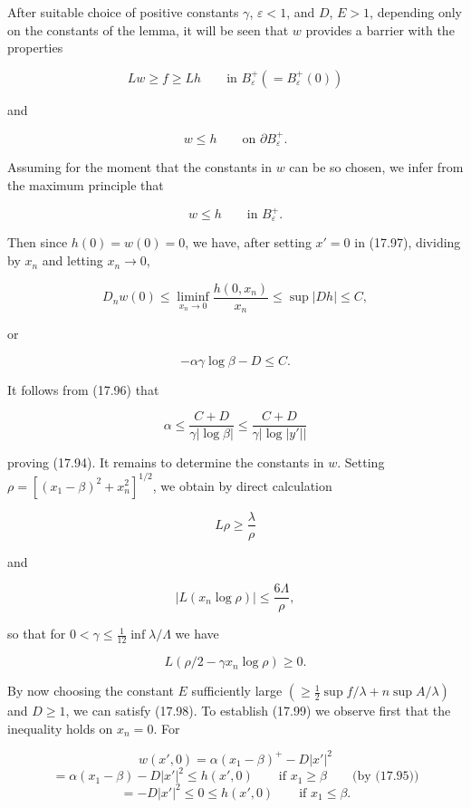After suitable choice of positive constants $\gamma$, $\varepsilon < 1$, and $D$, $E > 1$, depending only on the constants of the lemma, it will be seen that $w$ provides a barrier with the properties

\begin{equation}
\tag{17.98}
Lw \geq f \geq Lh \qquad \text{in } B_\varepsilon^+(= B_\varepsilon^+(0))
\end{equation}

and

\begin{equation}
\tag{17.99}
w \leq h \qquad \text{on } \partial B_\varepsilon^+.
\end{equation}

Assuming for the moment that the constants in $w$ can be so chosen, we infer from the maximum principle that

\[
w \leq h \qquad \text{in } B_\varepsilon^+.
\]


Then since $h(0) = w(0) = 0$, we have, after setting $x' = 0$ in (17.97), dividing by $x_n$
and letting $x_n \to 0$,

\[
D_n w(0) \leq \liminf_{x_n \to 0} \frac{h(0,x_n)}{x_n} \leq \sup |Dh| \leq C,
\]

or

\[
-\alpha \gamma \log \beta - D \leq C.
\]

It follows from (17.96) that

\[
\alpha \leq \frac{C + D}{\gamma |\log \beta|} \leq \frac{C + D}{\gamma |\log |y'||}
\]

proving (17.94).
It remains to determine the constants in $w$. Setting $\rho = \left[(x_1 - \beta)^2 + x_n^2\right]^{1/2}$, we
obtain by direct calculation

\[
L \rho \geq \frac{\lambda}{\rho}
\]

and

\[
|L(x_n \log \rho)| \leq \frac{6\Lambda}{\rho},
\]

so that for $0 < \gamma \leq \frac{1}{12} \inf \lambda/\Lambda$ we have

\[
L(\rho/2 - \gamma x_n \log \rho) \geq 0.
\]

By now choosing the constant $E$ sufficiently large $(\geq \frac{1}{2} \sup f/\lambda + n \sup A/\lambda)$ and
$D \geq 1$, we can satisfy (17.98).
To establish (17.99) we observe first that the inequality holds on $x_n = 0$. For

\[
w(x',0) = \alpha(x_1 - \beta)^+ - D|x'|^2
\]
\[
= \alpha(x_1 - \beta) - D|x'|^2 \leq h(x',0) \qquad \text{if } x_1 \geq \beta \qquad \text{(by (17.95))}
\]
\[
= -D|x'|^2 \leq 0 \leq h(x',0) \qquad \text{if } x_1 \leq \beta.
\]

